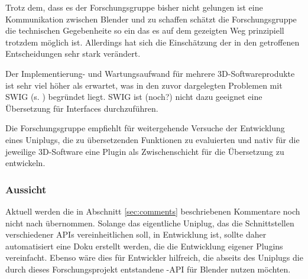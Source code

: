 
Trotz dem, dass es der Forschungsgruppe bisher nicht gelungen ist eine Kommunikation zwischen Blender und \CS zu schaffen schätzt die Forschungsgruppe die technischen Gegebenheite so ein das es auf dem gezeigten Weg prinzipiell trotzdem möglich ist. Allerdings hat sich die Einschätzung der in den  getroffenen Entscheidungen sehr stark verändert.

Der Implementierung- und Wartungsaufwand für mehrere 3D-Softwareprodukte ist sehr viel höher als erwartet, was in den zuvor dargelegten Problemen mit SWIG (s. ) begründet liegt. SWIG ist (noch?) nicht dazu geeignet eine Übersetzung für  Interfaces durchzuführen.

Die Forschungsgruppe empfiehlt für weitergehende Versuche der Entwicklung eines Uniplugs, die zu übersetzenden Funktionen zu evaluierten und nativ für die jeweilige 3D-Software eine Plugin als Zwischenschicht für die Übersetzung zu entwickeln.



\subsubsection{Aussicht}

Aktuell werden die in Abschnitt \ref{sec:comments} beschriebenen Kommentare noch nicht nach \CS übernommen. Solange das eigentliche Uniplug, das die Schnittstellen verschiedener APIs vereinheitlichen soll, in Entwicklung ist, sollte daher automatisiert eine Doku erstellt werden, die die Entwicklung eigener Plugins vereinfacht. Ebenso wäre dies für Entwickler hilfreich, die abseits des Uniplugs die durch dieses Forschungsprojekt entstandene \CC-API für Blender nutzen möchten.

